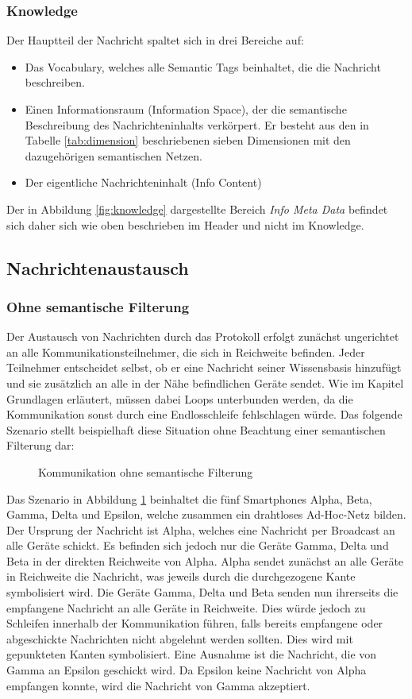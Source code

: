 \subsubsection{Knowledge}
Der Hauptteil der Nachricht spaltet sich in drei Bereiche auf:
\begin{itemize}
	\item Das Vocabulary, welches alle Semantic Tags beinhaltet, die die Nachricht beschreiben.
	\item Einen Informationsraum (Information Space), der die semantische Beschreibung des Nachrichteninhalts verkörpert. Er besteht aus den in Tabelle \ref{tab:dimension} beschriebenen sieben Dimensionen mit den dazugehörigen semantischen Netzen.
	\item Der eigentliche Nachrichteninhalt (Info Content)	
\end{itemize}
Der in Abbildung \ref{fig:knowledge} dargestellte Bereich \textit{Info Meta Data} befindet sich daher sich wie oben beschrieben im Header und nicht im Knowledge.
\subsection{Nachrichtenaustausch}
\subsubsection{Ohne semantische Filterung}
Der Austausch von Nachrichten durch das Protokoll erfolgt zunächst ungerichtet an alle Kommunikationsteilnehmer, die sich in Reichweite befinden. Jeder Teilnehmer entscheidet selbst, ob er eine Nachricht seiner Wissensbasis hinzufügt und sie zusätzlich an alle in der Nähe befindlichen Geräte sendet. Wie im Kapitel Grundlagen erläutert, müssen dabei Loops unterbunden werden, da die Kommunikation sonst durch eine Endlosschleife fehlschlagen würde. Das folgende Szenario stellt beispielhaft diese Situation ohne Beachtung einer semantischen  Filterung dar:
\vspace*{-2em}
\begin{figure}[H]
	\centering
	\caption{Kommunikation ohne semantische Filterung}
	\label{fig:beispielszenario}
\end{figure}
Das Szenario in Abbildung \ref{fig:beispielszenario} beinhaltet die fünf Smartphones Alpha, Beta, Gamma, Delta und Epsilon, welche zusammen ein drahtloses Ad-Hoc-Netz bilden. Der Ursprung der Nachricht ist Alpha, welches eine Nachricht per Broadcast an alle Geräte schickt. Es befinden sich jedoch nur die Geräte Gamma, Delta und Beta in der direkten Reichweite von Alpha. Alpha sendet zunächst an alle Geräte in Reichweite die Nachricht, was jeweils durch die durchgezogene Kante symbolisiert wird. Die Geräte Gamma, Delta und Beta senden nun ihrerseits die empfangene Nachricht an alle Geräte in Reichweite. Dies würde jedoch zu Schleifen innerhalb der Kommunikation führen, falls bereits empfangene oder abgeschickte Nachrichten nicht abgelehnt werden sollten. Dies wird mit gepunkteten Kanten symbolisiert. Eine Ausnahme ist die Nachricht, die von Gamma an Epsilon geschickt wird. Da Epsilon keine Nachricht von Alpha empfangen konnte, wird die Nachricht von Gamma akzeptiert. 
